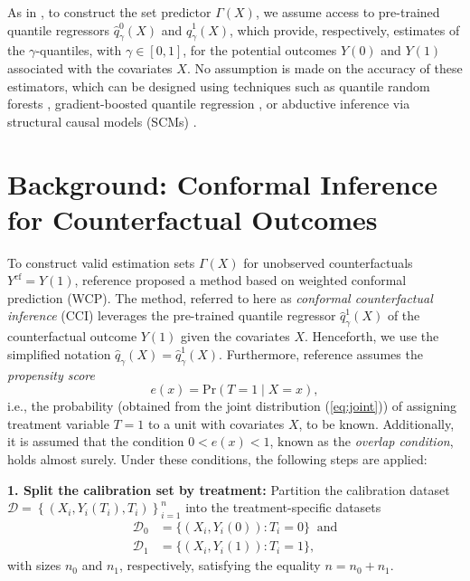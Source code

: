 \documentclass{article}
\theoremstyle{plain}
\theoremstyle{definition}
\theoremstyle{remark}
\begin{document}
As in \citep{lei2021conformal}, to construct the set predictor $\Gamma(X)$, we assume access to pre-trained quantile regressors $\hat{q}^0_\gamma(X)$ and $\hat{q}^1_\gamma(X)$, which provide, respectively, estimates of the $\gamma$-quantiles, with $\gamma \in [0,1]$, for the potential outcomes $Y(0)$ and $Y(1)$ associated with the covariates $X$. No assumption is made on the accuracy of these estimators, which can be designed using techniques such as quantile random forests \citep{meinshausen2006quantile}, gradient-boosted quantile regression \citep{friedman2001greedy}, or abductive inference via structural causal models (SCMs) \citep{pearl2009causality, louizos2017causal}.




\section{Background: Conformal Inference for Counterfactual Outcomes}
\label{sec:background}

To construct valid estimation sets $\Gamma(X)$ for unobserved counterfactuals $Y^\text{cf} = Y(1)$, reference \citep{lei2021conformal} proposed a method based on weighted conformal prediction (WCP). The method, referred to here as \textit{conformal counterfactual inference} (CCI) leverages the pre-trained quantile regressor $\hat{q}^1_\gamma (X)$ of the counterfactual outcome $Y(1)$ given the covariates $X$. Henceforth, we use the simplified notation $\hat{q}_\gamma (X) = \hat{q}^1_\gamma (X)$. Furthermore, reference \citep{lei2021conformal} assumes the \textit{propensity score}
\begin{equation}
e(x) = \mathrm{Pr}(T = 1 \mid X = x),
\end{equation}
i.e., the probability (obtained from the joint distribution (\ref{eq:joint})) of assigning treatment variable $T = 1$ to a unit with covariates $X$, to be known. Additionally, it is assumed that the condition $0<e(x)<1$, known as the \textit{overlap condition}, holds almost surely. Under these conditions, the following steps are applied:

 \textbf{1. Split the calibration set by treatment:} Partition the calibration dataset $\mathcal{D} = \left\{(X_i,  Y_i(T_i), T_i)\right\}_{i = 1}^n$ into the treatment-specific datasets
   \begin{equation}
\label{eq:calibration_data}
\begin{split}
\mathcal{D}_0 &= \{(X_i, Y_i(0)) : T_i = 0\}\;\;\text{and} \\
\mathcal{D}_1 &= \{(X_i, Y_i(1)) : T_i = 1\},
\end{split}
\end{equation}
    with sizes $n_0$ and $n_1$, respectively, satisfying the equality $n = n_0 + n_1$.
\end{document}

